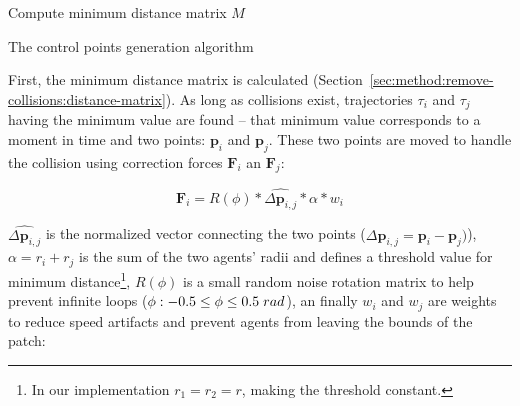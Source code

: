 

\begin{algorithm}[t]
Compute minimum distance matrix $M$\;
\caption{The control points generation algorithm}
\label{algo:control-points}
\end{algorithm}





First, the minimum distance matrix is calculated (Section~\ref{sec:method:remove-collisions:distance-matrix}).
As long as collisions exist, trajectories $\tau_i$ and $\tau_j$ having the minimum value are found -- that minimum value corresponds to a moment in time and two points: $\mathbf{p}_i$ and $\mathbf{p}_j$.
These two points are moved to handle the collision using correction forces $\mathbf{F}_i$ an $\mathbf{F}_j$:

\begin{equation}
	 \mathbf{F}_{i}= R(\phi) * \hat{\Delta{\mathbf{p}_{i, j}}}* \alpha * w_i
\end{equation}

$\hat{\Delta{\mathbf{p}_{i, j}}}$ is the normalized vector connecting the two points ($\Delta{\mathbf{p}_{i, j}} = \mathbf{p}_i - \mathbf{p}_j)$),
$\alpha = r_i + r_j$ is the sum of the two agents' radii and defines a threshold value for minimum distance\footnote{In our implementation $r_1 = r_2 = r$, making the threshold constant.},
$R(\phi)$ is a small random noise rotation matrix to help prevent infinite loops ($\phi: -0.5 \le \phi \le 0.5 \hspace{0.1cm} rad$),
an finally $w_i$ and $w_j$ are weights to reduce speed artifacts and prevent agents from leaving the bounds of the patch:

